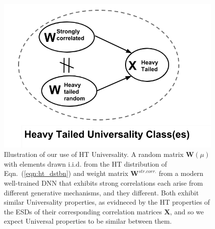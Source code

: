 


\begin{figure}[t]  %
   \centering
   \includegraphics[scale=0.36]{img/universality_classes.png} 
   \caption{Illustration of our use of HT Universality.  
            A random matrix $\mathbf{W}(\mu)$ with elements drawn i.i.d. from the HT distribution of Eqn.~(\ref{eqn:ht_dstbn}) and weight matrix $\mathbf{W}^{str. corr.}$ from a modern well-trained DNN that exhibits strong correlations each arise from different generative mechanisms, and they different.  Both exhibit similar Universality properties, as evidneced by the HT properties of the ESDs of their corresponding correlation matrices $\mathbf{X}$, and so we expect Universal properties to be similar between them.}
   \label{fig:universality_diagram}
\end{figure}


